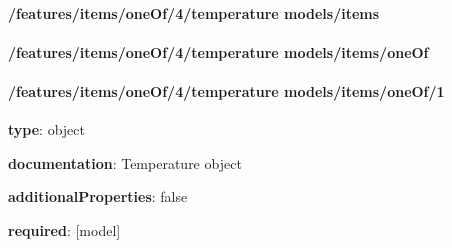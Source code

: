 \begin{itemized}
\paragraph{/features/items/oneOf/4/temperature models/items} \begin{itemized}
\end{itemized}\end{itemized}\paragraph{/features/items/oneOf/4/temperature models/items/oneOf} \begin{itemized}
\end{itemized}\paragraph{/features/items/oneOf/4/temperature models/items/oneOf/1} \begin{itemized}
\item {\bf type}: object
\item {\bf documentation}: Temperature object
\item {\bf additionalProperties}: false
\item {\bf required}: [model]\end{itemized}
